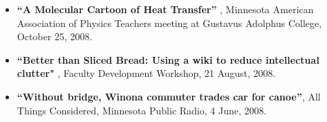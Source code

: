 \documentclass[margin,line,letterpaper]{res}
\begin{document}
\begin{resume}
\begin{itemize}
\item 
\textbf{``A Molecular Cartoon of Heat Transfer''}
, Minnesota American Association of Physics Teachers meeting at Gustavus Adolphus College, October 25, 2008.
%

\item 
\textbf{``Better than Sliced Bread: Using a wiki to reduce intellectual clutter"}
, Faculty Development Workshop, 21 August, 2008.
%

\item 
\textbf{``Without bridge, Winona commuter trades car for canoe''}, All Things Considered, Minnesota Public Radio, 4 June, 2008.
%


\end{itemize}
\end{resume}
\end{document}

